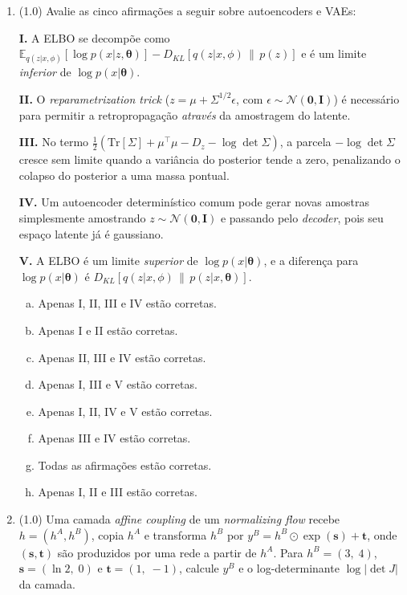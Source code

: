 \documentclass[11pt,a4paper]{article}
\newcommand{\thetav}{\boldsymbol{\theta}}
\begin{document}
\begin{enumerate}[1)]
\item (1.0) Avalie as cinco afirmações a seguir sobre autoencoders e VAEs:

\textbf{I.} A ELBO se decompõe como $\mathbb{E}_{q(z|x,\phi)}[\log p(x|z,\thetav)] - D_{KL}[q(z|x,\phi)\,\|\,p(z)]$ e é um limite \emph{inferior} de $\log p(x|\thetav)$.

\textbf{II.} O \textit{reparametrization trick} ($z = \mu + \Sigma^{1/2}\epsilon$, com $\epsilon \sim \mathcal{N}(\mathbf{0},\mathbf{I})$) é necessário para permitir a retropropagação \emph{através} da amostragem do latente.

\textbf{III.} No termo $\tfrac{1}{2}(\mathrm{Tr}[\Sigma] + \mu^{\top}\mu - D_z - \log\det\Sigma)$, a parcela $-\log\det\Sigma$ cresce sem limite quando a variância do posterior tende a zero, penalizando o colapso do posterior a uma massa pontual.

\textbf{IV.} Um autoencoder determinístico comum pode gerar novas amostras simplesmente amostrando $z \sim \mathcal{N}(\mathbf{0},\mathbf{I})$ e passando pelo \textit{decoder}, pois seu espaço latente já é gaussiano.

\textbf{V.} A ELBO é um limite \emph{superior} de $\log p(x|\thetav)$, e a diferença para $\log p(x|\thetav)$ é $D_{KL}[q(z|x,\phi)\,\|\,p(z|x,\thetav)]$.

\begin{enumerate}[a)]
    \item Apenas I, II, III e IV estão corretas.
    \item Apenas I e II estão corretas.
    \item Apenas II, III e IV estão corretas.
    \item Apenas I, III e V estão corretas.
    \item Apenas I, II, IV e V estão corretas.
    \item Apenas III e IV estão corretas.
    \item Todas as afirmações estão corretas.
    \item Apenas I, II e III estão corretas.
\end{enumerate}

\item (1.0) Uma camada \textit{affine coupling} de um \textit{normalizing flow} recebe $h = (h^A, h^B)$, copia $h^A$ e transforma $h^B$ por $y^B = h^B \odot \exp(\mathbf{s}) + \mathbf{t}$, onde $(\mathbf{s}, \mathbf{t})$ são produzidos por uma rede a partir de $h^A$. Para $h^B = (3,\; 4)$, $\mathbf{s} = (\ln 2,\; 0)$ e $\mathbf{t} = (1,\; -1)$, calcule $y^B$ e o log-determinante $\log\lvert\det J\rvert$ da camada.


\end{enumerate}
\end{document}
